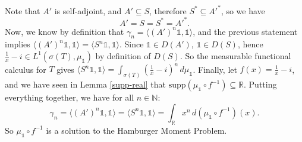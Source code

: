 \documentclass[12pt,oneside]{report}
\begin{document}
Note that $A'$ is self-adjoint, and $A' \subseteq S$, therefore $S^{*} \subseteq A'^{*}$, so we have
$$A' = S = S^{*} = A'^{*}.$$
Now, we know by definition that $\gamma_{n} = \langle (A')^{n}\mathds{1}, \mathds{1} \rangle$, and the previous statement implies $\langle (A')^{n}\mathds{1},\mathds{1} \rangle = \langle S^{n}\mathds{1},\mathds{1}\rangle$. Since $\mathds{1} \in D(A')$, $\mathds{1} \in D(S)$, hence $\frac{1}{x} - i \in L^{1}(\sigma(T),\mu_\mathds{1})$ by definition of $D(S)$. So the measurable functional calculus for $T$ gives $\langle S^{n}\mathds{1},\mathds{1} \rangle = \int _{\sigma(T)} \left( \frac{1}{x} - i \right)^{n} \, d\mu_{\mathds{1}}$. Finally, let $f(x) = \frac{1}{x} - i$, and we have seen in Lemma \ref{supp-real} that $\mathrm{supp}\left( \mu_{\mathds{1}} \circ f^{-1} \right) \subseteq \mathbb{R}$. Putting everything together, we have for all $n \in \mathbb{N}$:
$$\gamma_{n} = \langle (A')^{n}\mathds{1},\mathds{1} \rangle = \langle S^{n}\mathds{1},\mathds{1} \rangle = \int _{\mathbb{R}} x^{n} \, d(\mu_{\mathds{1}} \circ f^{-1})(x).$$
So $\mu_{\mathds{1}} \circ f^{-1}$ is a solution to the Hamburger Moment Problem.



 
%
\end{document}
